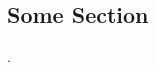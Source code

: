 \documentclass[12pt]{article}
\begin{document}
\begin{spacing}{1.32}
\section{Some Section}

\cite{gentzkow2011ideological}.

\end{spacing}

\appendix


\end{document}
